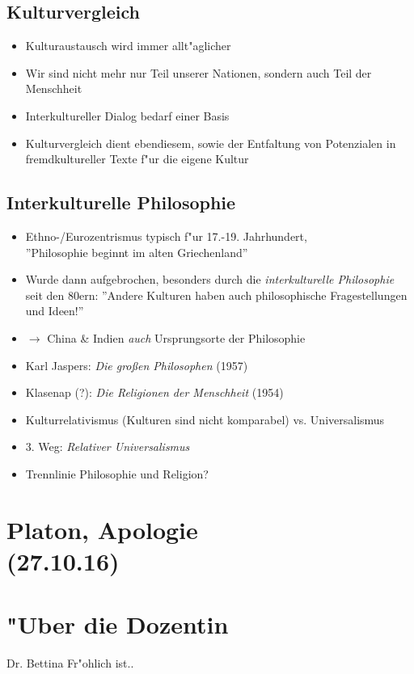 \documentclass[]{scrartcl}
\begin{document}
\subsection{Kulturvergleich}

\begin{itemize}
  \item Kulturaustausch wird immer allt"aglicher
  \item Wir sind nicht mehr nur Teil unserer Nationen, sondern auch Teil der Menschheit
  \item Interkultureller Dialog bedarf einer Basis
  \item Kulturvergleich dient ebendiesem, sowie der Entfaltung von Potenzialen in fremdkultureller Texte f"ur die eigene Kultur
\end{itemize}

\subsection{Interkulturelle Philosophie}
\begin{itemize}
  \item Ethno-/Eurozentrismus typisch f"ur 17.-19. Jahrhundert, \\''Philosophie beginnt im alten Griechenland''
  \item Wurde dann aufgebrochen, besonders durch die \emph{interkulturelle Philosophie} seit den 80ern: ''Andere Kulturen haben auch philosophische Fragestellungen und Ideen!''
  \item $\rightarrow$ China \& Indien \emph{auch} Ursprungsorte der Philosophie
  \item Karl Jaspers: \emph{Die gro\ss en Philosophen} (1957)
  \item Klasenap (?): \emph{Die Religionen der Menschheit} (1954)
  \item Kulturrelativismus (Kulturen sind nicht komparabel) vs. Universalismus
  \item 3. Weg: \emph{Relativer Universalismus}
  \item Trennlinie Philosophie und Religion?
\end{itemize}


\newpage

\section{Platon, Apologie\\(27.10.16)}





\newpage
\section{"Uber die Dozentin}
Dr. Bettina Fr"ohlich ist..
\end{document}
